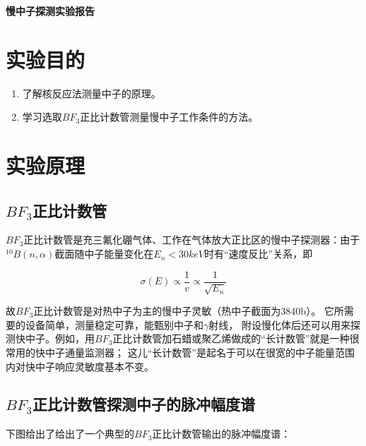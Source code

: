 \documentclass[a4paper,UTF8]{ctexart}
\begin{document}
\begin{center}
    \textbf{\Large 慢中子探测实验报告}
    \par {}
\end{center}

\section{实验目的}

\begin{enumerate}
    \item 了解核反应法测量中子的原理。
    \item 学习选取$BF_3$正比计数管测量慢中子工作条件的方法。
\end{enumerate}

\section{实验原理}

\subsection{$BF_3$正比计数管}

$BF_3$正比计数管是充三氟化硼气体、工作在气体放大正比区的慢中子探测器：由于$^{10}B(n,\alpha)$截面随中子能量变化在$E_n < 30keV$时有“速度反比”关系，即

\begin{equation}
    \sigma(E) \propto \frac{1}{v} \propto \frac{1}{\sqrt{E_n}}
\end{equation}

故$BF_3$正比计数管是对热中子为主的慢中子灵敏（热中子截面为3840b）。
它所需要的设备简单，测量稳定可靠，能甄别中子和$\gamma$射线，
附设慢化体后还可以用来探测快中子。例如，用$BF_3$正比计数管加石蜡或聚乙烯做成的“长计数管”就是一种很常用的快中子通量监测器；
这儿“长计数管”是起名于可以在很宽的中子能量范围内对快中子响应灵敏度基本不变。

\subsection{$BF_3$正比计数管探测中子的脉冲幅度谱}

下图给出了给出了一个典型的$BF_3$正比计数管输出的脉冲幅度谱：
\end{document}
